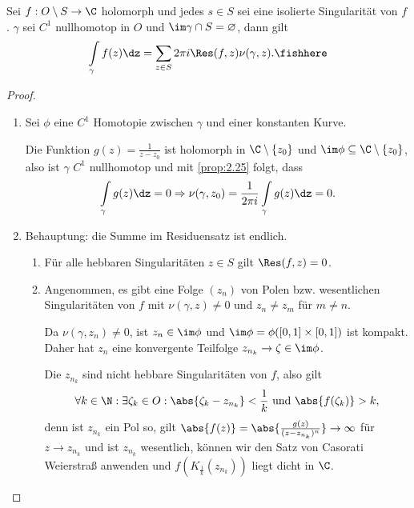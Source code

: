 \begin{prop}[Residuensatz]
\label{prop:2.91}
Sei $f:O\setminus S\to \C$ holomorph und jedes $s\in S$ sei eine isolierte
Singularität von $f$. $\gamma$ sei $C^1$ nullhomotop in $O$ und $\im \gamma\cap
S = \varnothing$, dann gilt
\begin{align*}
\int\limits_{\gamma} f(z)\dz = \sum\limits_{z\in S} 2\pi
i\Res(f,z)\nu(\gamma,z).\fishhere
\end{align*}
\end{prop}
\begin{proof}
\begin{enumerate}[label=\arabic{*}.)]
  \item\label{proof:2.91:1} Sei $\phi$ eine $C^1$ Homotopie zwischen $\gamma$
  und einer konstanten Kurve.
  
  Die Funktion $g(z) = \frac{1}{z-z_0}$ ist holomorph in $\C\setminus\{z_0\}$
  und $\im \phi\subseteq \C\setminus\{z_0\}$, also ist $\gamma$ $C^1$
  nullhomotop und mit \ref{prop:2.25} folgt, dass
  \begin{align*}
  \int\limits_\gamma g(z)\dz = 0 \Rightarrow \nu(\gamma, z_0) = \frac{1}{2\pi
  i}\int\limits_\gamma g(z)\dz = 0.
  \end{align*}
\item\label{proof:2.91:2} Behauptung: die Summe im Residuensatz ist endlich.

\begin{enumerate}[label=(\alph{*})]
  \item Für alle hebbaren Singularitäten $z\in S$ gilt $\Res(f,z) = 0$.
  \item Angenommen, es gibt eine Folge $(z_n)$ von Polen bzw.
  wesentlichen Singularitäten von $f$ mit $\nu(\gamma,z)\neq 0$ und $z_n\neq
  z_m$ für $m\neq n$.
  
  Da $\nu(\gamma,z_n)\neq 0$, ist
  $z_n\in\im\phi$ und $\im\phi = \phi([0,1]\times[0,1])$ ist kompakt. Daher hat
  $z_n$ eine konvergente Teilfolge $z_{n_k}\to\zeta\in\im\phi$.
  
  Die $z_{n_k}$ sind nicht hebbare Singularitäten von $f$, also gilt
  \begin{align*}
  \forall k\in\N : \exists \zeta_k\in O : \abs{\zeta_k-z_{n_k}} < \frac{1}{k}
  \text{ und } \abs{f(\zeta_k)} > k,
  \end{align*}
denn ist $z_{n_k}$ ein Pol so, gilt $\abs{f(z)} =
\abs{\frac{g(z)}{(z-z_{n_k})^n}} \to\infty$ für $z\to z_{n_k}$ und
ist $z_{n_k}$ wesentlich, können wir den Satz von Casorati Weierstraß
anwenden und $f(K_{\frac{1}{k}}(z_{n_k}))$ liegt dicht in $\C$.


\end{enumerate}
\end{enumerate}
\end{proof}
